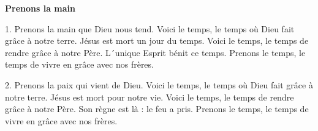 \textbf{Prenons la main}

1. Prenons la main que Dieu nous tend.
Voici le temps, le temps où Dieu fait grâce à notre terre.
Jésus est mort un jour du temps.
Voici le temps, le temps de rendre grâce à notre Père.
L´unique Esprit bénit ce temps.
Prenons le temps, le temps de vivre en grâce avec nos frères.

2. Prenons la paix qui vient de Dieu.
Voici le temps, le temps où Dieu fait grâce à notre terre.
Jésus est mort pour notre vie.
Voici le temps, le temps de rendre grâce à notre Père.
Son règne est là : le feu a pris.
Prenons le temps, le temps de vivre en grâce avec nos frères.

